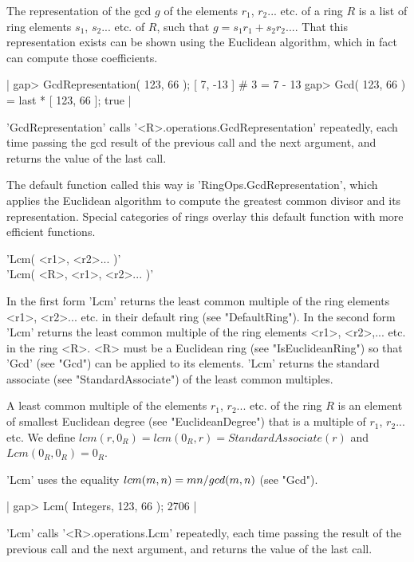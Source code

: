 The representation of the gcd  $g$ of  the elements $r_1$, $r_2$...  etc.
of a ring $R$ is  a  list of ring  elements $s_1$,  $s_2$... etc. of $R$,
such that $g = s_1 r_1 + s_2  r_2 ...$.  That this  representation exists
can be shown using the  Euclidean algorithm,  which in fact  can  compute
those coefficients.

|    gap> GcdRepresentation( 123, 66 );
    [ 7, -13 ]    # 3 = 7 - 13
    gap> Gcd( 123, 66 ) = last * [ 123, 66 ];
    true |

'GcdRepresentation'  calls '<R>.operations.GcdRepresentation' repeatedly,
each  time  passing  the gcd result  of the previous  call  and  the next
argument, and returns the value of the last call.

The default    function called  this way  is 'RingOps.GcdRepresentation',
which applies the   Euclidean algorithm  to  compute the greatest  common
divisor and its representation.  Special categories of rings overlay this
default function with more efficient functions.


'Lcm( <r1>, <r2>... )'\\
'Lcm( <R>, <r1>, <r2>... )'

In the first  form 'Lcm' returns  the  least common multiple of the  ring
elements <r1>, <r2>...  etc.  in  their default ring (see "DefaultRing").
In the second  form 'Lcm' returns the least  common  multiple of the ring
elements <r1>, <r2>,... etc.  in the ring  <R>.  <R> must be a  Euclidean
ring (see "IsEuclideanRing") so that 'Gcd' (see "Gcd") can be  applied to
its    elements.    'Lcm'   returns    the   standard     associate  (see
"StandardAssociate") of the least common multiples.

A least common multiple of  the elements  $r_1$, $r_2$...   etc.  of  the
ring   $R$   is   an   element   of   smallest   Euclidean   degree  (see
"EuclideanDegree") that is a multiple of $r_1$, $r_2$...  etc.  We define
$lcm( r,  0_R ) = lcm( 0_R, r ) =  StandardAssociate( r )$ and $Lcm( 0_R,
0_R ) = 0_R$.

'Lcm' uses the equality $lcm(m,n) = m\*n / gcd(m,n)$ (see "Gcd").

|    gap> Lcm( Integers, 123, 66 );
    2706 |

'Lcm' calls '<R>.operations.Lcm' repeatedly, each time passing the result
of the previous call and the next argument,  and returns the value of the
last call.

